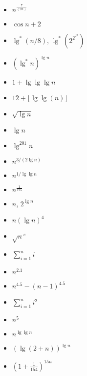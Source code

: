 \begin{homeworkProblem}
\begin{itemize}
\item $n^{\frac{7}{(2n)}}$
\item $\cos{n} + 2$
\item $\lg^*\left(n/8\right)$, $\lg^*\left(2^{2^{2^{n}}}\right)$
\item $(\lg^*n)^{\lg n}$
\item $1+\lg\lg\lg n$
\item $12 + \lfloor\lg\lg(n)\rfloor$
\item $\sqrt{\lg n}$
\item $\lg n$
\item $\lg^{201}n$
\item $n^{3/(2\lg n)}$
\item $n^{1/\lg\lg n}$
\item $n^{\frac{1}{125}}$
\item $n$, $2^{\lg n}$
\item $n(\lg n)^4$
\item $\sqrt{n}^e$
\item $\sum_{i = 1}^n i$
\item $n^{2.1}$
\item $n^{4.5}-(n-1)^{4.5}$
\item $\sum_{i = 1}^n i^2$
\item $n^{5}$
\item $n^{\lg\lg n}$
\item $(\lg(2+n))^{\lg n}$
\item $\left(1+\frac{1}{154}\right)^{15n}$
\end{itemize}

\end{homeworkProblem}
